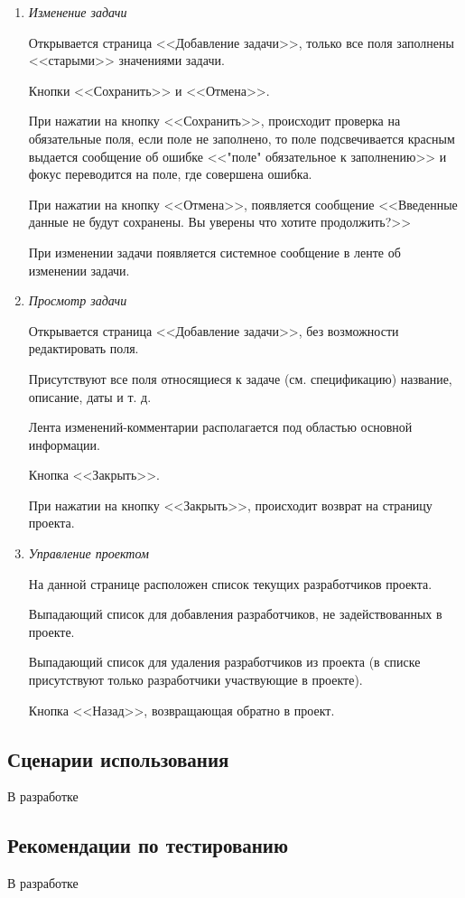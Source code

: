 \documentclass[14pt,a4paper]{extarticle}
\begin{document}
\begin{enumerate}
		\item {\it Изменение задачи}
		\par Открывается страница <<Добавление задачи>>, только все поля заполнены <<старыми>> значениями задачи.
		\par Кнопки <<Сохранить>> и <<Отмена>>.
		\par При нажатии на кнопку <<Сохранить>>, происходит проверка на обязательные поля, если поле не заполнено, то поле подсвечивается красным выдается сообщение об ошибке <<"поле" обязательное к заполнению>> и фокус переводится на поле, где совершена ошибка.
		\par При нажатии на кнопку <<Отмена>>, появляется сообщение <<Введенные данные не будут сохранены. Вы уверены что хотите продолжить?>>
		\par При изменении задачи появляется системное сообщение в ленте об изменении задачи.
		
		\item {\it Просмотр задачи}
		\par Открывается страница <<Добавление задачи>>, без возможности редактировать поля.
		\par Присутствуют все поля относящиеся к задаче (см. спецификацию) название, описание, даты и т. д.
		\par Лента изменений-комментарии располагается под областью основной информации.
		\par Кнопка <<Закрыть>>.
		\par При нажатии на кнопку <<Закрыть>>, происходит возврат на страницу проекта.
		
		\item {\it Управление проектом}
		\par На данной странице расположен список текущих разработчиков проекта.
		\par Выпадающий список для добавления разработчиков, не задействованных в проекте.
		\par Выпадающий список для удаления разработчиков из проекта (в списке присутствуют только разработчики участвующие в проекте).
		\par Кнопка <<Назад>>, возвращающая обратно в проект.

	\end{enumerate}
			
	\subsection {Сценарии использования}
	В разработке
		
	\subsection {Рекомендации по тестированию}
	В разработке
	
\end{document}
